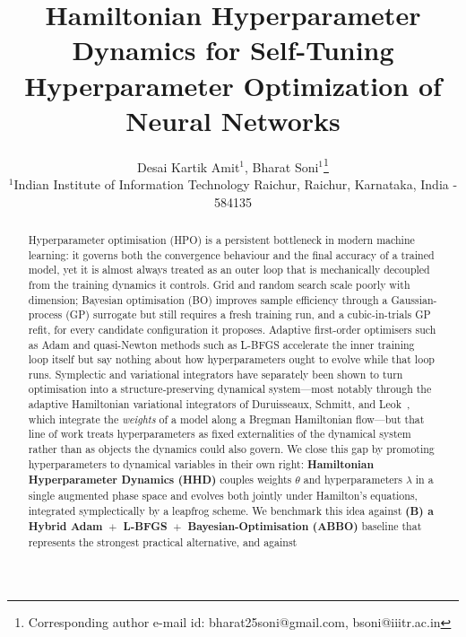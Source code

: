 \documentclass[11pt]{article}
\theoremstyle{definition}
\begin{document}
\title{Hamiltonian Hyperparameter Dynamics for Self-Tuning Hyperparameter Optimization of Neural Networks}
	\author{Desai Kartik Amit$^{1}$, Bharat Soni$^{1}$\thanks{Corresponding author e-mail id: bharat25soni@gmail.com, bsoni@iiitr.ac.in}
        \\ $^1$Indian Institute of Information Technology Raichur, Raichur, Karnataka, India - 584135
	}
	\date{}
	\maketitle


\begin{abstract}
Hyperparameter optimisation (HPO) is a persistent bottleneck in
modern machine learning: it governs both the convergence behaviour
and the final accuracy of a trained model, yet it is almost always
treated as an outer loop that is mechanically decoupled from the
training dynamics it controls.  Grid and random search scale poorly
with dimension; Bayesian optimisation (BO) improves sample efficiency
through a Gaussian-process (GP) surrogate but still requires a fresh
training run, and a cubic-in-trials GP refit, for every candidate
configuration it proposes.  Adaptive first-order optimisers such as
Adam and quasi-Newton methods such as L-BFGS accelerate the inner
training loop itself but say nothing about how hyperparameters ought
to evolve while that loop runs.  Symplectic and variational
integrators have separately been shown to turn optimisation into a
structure-preserving dynamical system---most notably through the
adaptive Hamiltonian variational integrators of Duruisseaux, Schmitt,
and Leok~\cite{duruisseaux2021adaptive}, which integrate the
\emph{weights} of a model along a Bregman Hamiltonian flow---but that
line of work treats hyperparameters as fixed externalities of the
dynamical system rather than as objects the dynamics could also
govern. We close this gap by promoting hyperparameters to dynamical
variables in their own right: \textbf{Hamiltonian Hyperparameter
Dynamics (HHD)} couples weights $\theta$ and hyperparameters
$\lambda$ in a single augmented phase space and evolves both jointly
under Hamilton's equations, integrated symplectically by a leapfrog
scheme. We benchmark this idea against \textbf{(B) a Hybrid
Adam~$+$~L-BFGS~$+$~Bayesian-Optimisation (ABBO)} baseline that
represents the strongest practical alternative, and against

\end{abstract}
\end{document}
